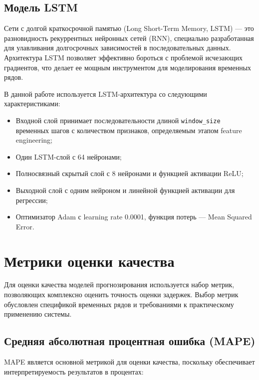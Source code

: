 \subsection{Модель LSTM}
\hspace*{1.25cm}Сети с долгой краткосрочной памятью (Long Short-Term Memory, LSTM) — это разновидность рекуррентных нейронных сетей (RNN), специально разработанная для улавливания долгосрочных зависимостей в последовательных данных. Архитектура LSTM позволяет эффективно бороться с проблемой исчезающих градиентов, что делает ее мощным инструментом для моделирования временных рядов.

\hspace*{1.25cm}В данной работе используется LSTM-архитектура со следующими характеристиками:
\begin{itemize}
	\item Входной слой принимает последовательности длиной \texttt{window\_size} временных шагов с количеством признаков, определяемым этапом feature engineering;
	\item Один LSTM-слой с 64 нейронами;
	\item Полносвязный скрытый слой с 8 нейронами и функцией активации ReLU;
	\item Выходной слой с одним нейроном и линейной функцией активации для регрессии;
	\item Оптимизатор Adam с learning rate 0.0001, функция потерь --- Mean Squared Error.
\end{itemize}

\section{Метрики оценки качества}
\label{sec:evaluation_metrics}

\hspace*{1.25cm}Для оценки качества моделей прогнозирования используется набор метрик, позволяющих комплексно оценить точность оценки задержек. Выбор метрик обусловлен спецификой временных рядов и требованиями к практическому применению системы.

\subsection{Средняя абсолютная процентная ошибка (MAPE)}

\hspace*{1.25cm}MAPE является основной метрикой для оценки качества, поскольку обеспечивает интерпретируемость результатов в процентах:


